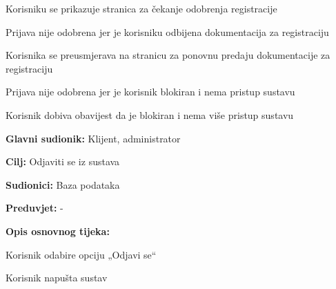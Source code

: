 \begin{packed_item}
\begin{packed_item}
\begin{packed_enum}
									\item Korisniku se prikazuje stranica za čekanje odobrenja registracije
								\end{packed_enum}
								\item[4.b] Prijava nije odobrena jer je korisniku odbijena dokumentacija za registraciju
								\item[] \begin{packed_enum}
									\item Korisnika se preusmjerava na stranicu za ponovnu predaju dokumentacije za registraciju
								\end{packed_enum}
								\item[4.c] Prijava nije odobrena jer je korisnik blokiran i nema pristup sustavu
								\item[] \begin{packed_enum}
									\item Korisnik dobiva obavijest da je blokiran i nema više pristup sustavu
								\end{packed_enum}
								
								
								
							\end{packed_item}
						\end{packed_item}
						\noindent {}
						\begin{packed_item}
							
							\item \textbf{Glavni sudionik: } Klijent, administrator
							\item  \textbf{Cilj: } Odjaviti se iz sustava
							\item  \textbf{Sudionici: }Baza podataka
							\item  \textbf{Preduvjet: }-
							\item  \textbf{Opis osnovnog tijeka:}
							
							\item[] \begin{packed_enum}
								
								\item 	Korisnik odabire opciju „Odjavi se“
								\item 	Korisnik napušta sustav
								
								
							\end{packed_enum}
						\end{packed_item}
						\noindent {}
